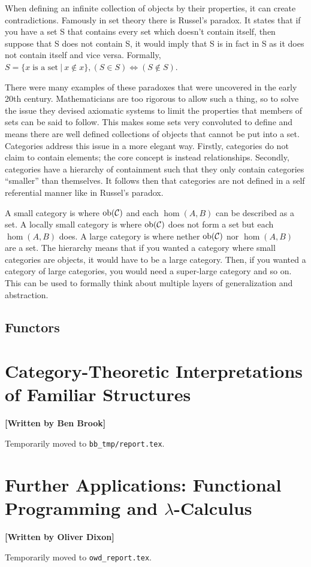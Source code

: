 \documentclass[10pt,a4paper,reqno]{amsart}
\numberwithin{figure}{section}
\begin{document}
When defining an infinite collection of objects by their properties, it can
create contradictions. Famously in set theory there is Russel's paradox.  It
states that if you have a set S that contains every set which doesn't contain
itself, then suppose that S does not contain S, it would imply that S is in fact
in S as it does not contain itself and vice versa.  Formally, $S = \{x\;\text{is
a set}\:|\:x\notin x\}, (S\in S) \iff (S\notin S)$.

There were many examples of these paradoxes that were uncovered in the early
20th century. Mathematicians are too rigorous to allow such a thing, so to solve
the issue they devised axiomatic systems to limit the properties that members of
sets can be said to follow.  This makes some sets very convoluted to define and
means there are well defined collections of objects that cannot be put into a
set. Categories address this issue in a more elegant way.  Firstly, categories
do not claim to contain elements; the core concept is instead relationships.
Secondly, categories have a hierarchy of containment such that they only contain
categories ``smaller'' than themselves.  It follows then that categories are not
defined in a self referential manner like in Russel's paradox.

A small category is where $\operatorname{ob}(\mathcal{C})$ and each $\hom(A,B)$ can be
described as a set.  A locally small category is where $\operatorname{ob}(\mathcal{C})$
does not form a set but each $\hom(A,B)$ does.  A large category is where nether
$\operatorname{ob}(\mathcal{C})$ nor $\hom(A,B)$ are a set. The hierarchy means that if you
wanted a category where small categories are objects, it would have to be a
large category. Then, if you wanted a category of large categories, you would
need a super-large category and so on. This can be used to formally think about
multiple layers of generalization and abstraction.

\subsection{Functors}

\section{Category-Theoretic %
        Interpretations of Familiar Structures}
\begin{flushright}
        \textbf{[Written by Ben Brook]}
\end{flushright}

\noindent Temporarily moved to \texttt{bb\_tmp/report.tex}.

\section{Further Applications: %
        Functional Programming and \texorpdfstring{$\lambda$}{Lambda}-Calculus}
\begin{flushright}
        \textbf{[Written by Oliver Dixon]}
\end{flushright}

\noindent Temporarily moved to \texttt{owd\_report.tex}.
\end{document}
